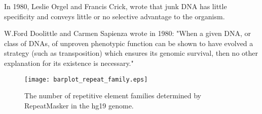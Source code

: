 In 1980, Leslie Orgel and Francis Crick, wrote that junk DNA has little specificity and conveys little or no selective advantage to the organism\cite{orgel1980selfish}.

W.Ford Doolittle and Carmen Sapienza wrote in 1980\cite{doolittle1980selfish}: "When a given DNA, or class of DNAs, of unproven phenotypic function can be shown to have evolved a strategy (such as transposition) which ensures its genomic survival, then no other explanation for its existence is necessary."

\begin{figure}[h]
  \centering
  \texttt{[image: barplot\_repeat\_family.eps]}
  \caption[Tally of repetitive element families in the hg19 genome]
   {The number of repetitive element families determined by RepeatMasker in the hg19 genome.}
\end{figure}

